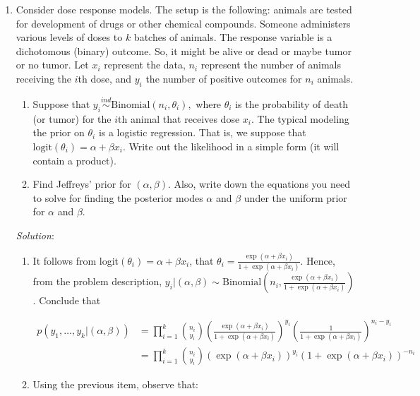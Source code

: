 \documentclass[11pt]{article}
\begin{document}
\begin{enumerate}
\item Consider  dose response models. The setup is the following: animals are tested for development of drugs or other chemical compounds. Someone administers various levels of doses to $k$ batches of animals. The response variable is a dichotomous (binary) outcome. So, it might be alive or dead or maybe tumor or no tumor. Let $x_i$ represent the data, $n_i$ represent the number of animals receiving the $i$th dose, and $y_i$ the number of positive outcomes for $n_i$ animals. 
\begin{enumerate}
\item Suppose that $y_i \stackrel{ind}{\sim} \text{Binomial}(n_i, \theta_i),$ where
$\theta_i$ is the probability of death (or tumor) for the $i$th animal that receives dose $x_i$. The typical modeling the prior on $\theta_i$ is a logistic regression. That is, we suppose that 
$\text{logit}(\theta_i) = \alpha + \beta x_i.$
Write out the likelihood in a simple form (it will contain a product). 
\item Find Jeffreys' prior for  $(\alpha, \beta).$ Also, write down the equations you need to solve for finding the posterior modes $\alpha$ and $\beta$ under the uniform prior for $\alpha$ and $\beta.$
\end{enumerate}

\emph{Solution}:

\begin{enumerate}
	\item It follows from logit$(\theta_{i}) = \alpha + \beta x_{i}$, that $\theta_{i} = \frac{\exp(\alpha + \beta x_{i})}{1+\exp(\alpha + \beta x_{i})}$. Hence, from the problem description, $y_{i}|(\alpha,\beta) \sim \text{Binomial}\left(n_{i},\frac{\exp(\alpha + \beta x_{i})}{1+\exp(\alpha + \beta x_{i})}\right)$. Conclude that
	
	\begin{align*}
		p(y_{1},\ldots,y_{k}|(\alpha,\beta))	&= \prod_{i=1}^{k}{{n_{i} \choose y_{i}} \left(\frac{\exp(\alpha + \beta x_{i})}{1+\exp(\alpha + \beta x_{i})}\right)^{y_{i}} \left(\frac{1}{1+\exp(\alpha + \beta x_{i})}\right)^{n_{i}-y_{i}}} \\
																					&= \prod_{i=1}^{k}{{n_{i} \choose y_{i}} \left(\exp(\alpha + \beta x_{i})\right)^{y_{i}} \left(1+\exp(\alpha + \beta x_{i})\right)^{-n_{i}}}
	\end{align*}
	
	\item Using the previous item, observe that:
	

\end{enumerate}
\end{enumerate}
\end{document}
